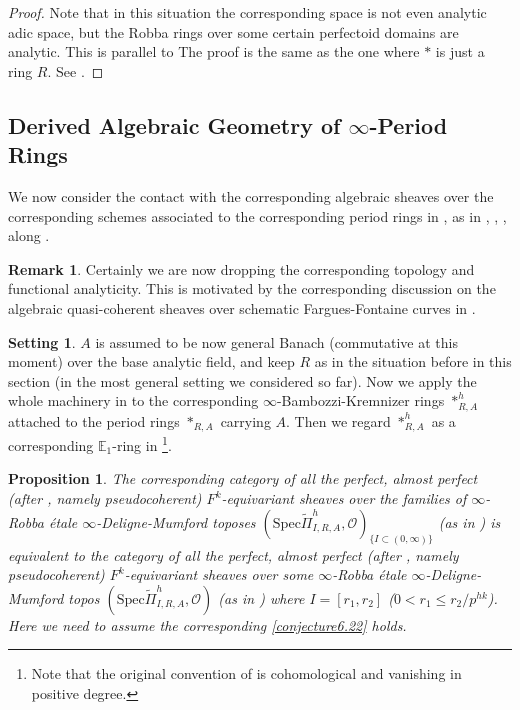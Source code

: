 \documentclass[12pt]{amsart}
\newtheorem{proposition}[theorem]{Proposition}
\theoremstyle{definition}
\newtheorem{remark}[theorem]{Remark}
\numberwithin{equation}{section}
\newtheorem{setting}[theorem]{Setting}
\begin{document}
\begin{proof}
Note that in this situation the corresponding space is not even analytic adic space, but the Robba rings over some certain perfectoid domains are analytic. This is parallel to \cite[Theorem 4.6.1]{KL2}The proof is the same as the one where $*$ is just a ring $R$. See \cite[Theorem 4.11]{XT2}.	
\end{proof}











\subsection{Derived Algebraic Geometry of $\infty$-Period Rings}

\indent We now consider the contact with the corresponding algebraic sheaves over the corresponding schemes associated to the corresponding period rings in \cite{KL1}, \cite{KL2} as in \cite{XT1}, \cite{XT2}, \cite{XT3}, \cite{XT4} along \cite{KL1}.

\begin{remark}
Certainly we are now dropping the corresponding topology and functional analyticity. This is motivated by the corresponding discussion on the algebraic quasi-coherent sheaves over schematic Fargues-Fontaine curves in \cite{KL2}.
\end{remark}
 

\begin{setting}
$A$ is assumed to be now general Banach (commutative at this moment) over the base analytic field, and keep $R$ as in the situation before in this section (in the most general setting we considered so far). Now we apply the whole machinery in \cite{Lu1} to the corresponding $\infty$-Bambozzi-Kremnizer rings $*^h_{R,A}$ attached to the period rings $*_{R,A}$ carrying $A$. Then we regard $*^h_{R,A}$ as a corresponding $\mathbb{E}_1$-ring in \cite{Lu1} \footnote{Note that the original convention of \cite{BK1} is cohomological and vanishing in positive degree.}.
\end{setting}





\begin{proposition}
The corresponding category of all the perfect, almost perfect (after \cite[Section 7.2.4]{Lu1}, namely pseudocoherent) $F^k$-equivariant sheaves over the families of $\infty$-Robba \'etale $\infty$-Deligne-Mumford toposes $(\mathrm{Spec}\widetilde{\Pi}^h_{I,R,A},\mathcal{O})_{\{I \subset (0,\infty)\}}$ (as in \cite[Chapter 1.4]{Lu2}) is equivalent to the category of all the perfect, almost perfect (after \cite[Section 7.2.4]{Lu1}, namely pseudocoherent) $F^k$-equivariant sheaves over some $\infty$-Robba \'etale $\infty$-Deligne-Mumford topos $(\mathrm{Spec}\widetilde{\Pi}^h_{I,R,A},\mathcal{O})$ (as in \cite[Chapter 1.4]{Lu2}) where $I=[r_1,r_2]$ ($0<r_1\leq r_2/p^{hk}$). Here we need to assume the corresponding \cref{conjecture6.22} holds.	
\end{proposition}
\end{document}
